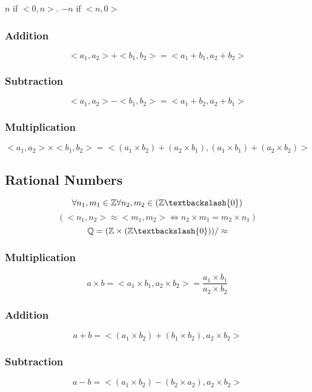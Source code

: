 \documentclass[12pt]{article}
\begin{document}
\begin{spacing}{1.5}
$n$ if $<0, n>$. $-n$ if $<n, 0>$

\subsubsection{Addition}

$$<a_1, a_2> + <b_1, b_2> = < a_1 + b_1, a_2 + b_2 >$$

\subsubsection{Subtraction}

$$<a_1, a_2> - <b_1, b_2> = < a_1 + b_2, a_2 + b_1 >$$

\subsubsection{Multiplication}

$$<a_1, a_2> \times <b_1, b_2> = < (a_1 \times b_2) + (a_2 \times b_1), (a_1 \times b_1) + (a_2 \times b_2) >$$

\subsection{Rational Numbers}

$$\forall n_1, m_1 \in \mathbb{Z} \forall n_2, m_2 \in (\mathbb{Z} \textbackslash \{0\})$$
$$(<n_1, n_2> \approx <m_1, m_2> \Leftrightarrow n_2 \times m_1 = m_2 \times n_1)$$
$$\mathbb{Q} = (\mathbb{Z} \times (\mathbb{Z} \textbackslash {0})) / \approx$$

\subsubsection{Multiplication}

$$a \times b = < a_1 \times b_1, a_2 \times b_2 > = \frac{a_1\times b_1}{a_2 \times b_2}$$

\subsubsection{Addition}

$$a + b = < (a_1 \times b_2) + (b_1 \times b_2), a_2 \times b_2 >$$

\subsubsection{Subtraction}

$$a - b = < (a_1 \times b_2) - (b_2 \times a_2), a_2 \times b_2 >$$


\end{spacing}
\end{document}
